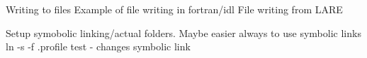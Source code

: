 Writing to files
Example of file writing in fortran/idl
File writing from LARE

Setup
symobolic linking/actual folders. Maybe easier always to use symbolic links
ln -s -f .profile test - changes symbolic link